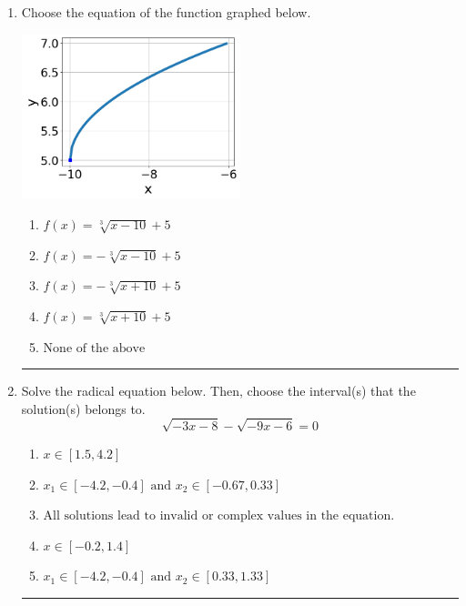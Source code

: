 \documentclass[14pt]{extbook}
\newcommand{\litem}[1]{\item#1\hspace*{-1cm}\rule{\textwidth}{0.4pt}}
\begin{document}
\begin{enumerate}
{\begin{enumerate}[label=\Alph*.]
\end{enumerate} }
\litem{
Choose the equation of the function graphed below.
\begin{center}
    \includegraphics[width=0.5\textwidth]{../Figures/radicalGraphToEquationB.png}
\end{center}
\begin{enumerate}[label=\Alph*.]
\item \( f(x) = \sqrt[3]{x - 10} + 5 \)
\item \( f(x) = - \sqrt[3]{x - 10} + 5 \)
\item \( f(x) = - \sqrt[3]{x + 10} + 5 \)
\item \( f(x) = \sqrt[3]{x + 10} + 5 \)
\item \( \text{None of the above} \)

\end{enumerate} }
\litem{
Solve the radical equation below. Then, choose the interval(s) that the solution(s) belongs to.\[ \sqrt{-3 x - 8} - \sqrt{-9 x - 6} = 0 \]\begin{enumerate}[label=\Alph*.]
\item \( x \in [1.5,4.2] \)
\item \( x_1 \in [-4.2, -0.4] \text{ and } x_2 \in [-0.67,0.33] \)
\item \( \text{All solutions lead to invalid or complex values in the equation.} \)
\item \( x \in [-0.2,1.4] \)
\item \( x_1 \in [-4.2, -0.4] \text{ and } x_2 \in [0.33,1.33] \)

\end{enumerate} }
\end{enumerate}
\end{document}
